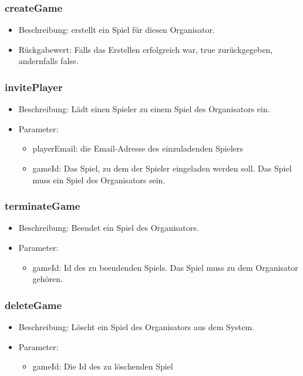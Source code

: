 \documentclass[a4paper]{scrreprt}
\begin{document}
    \subsubsection{createGame}
    \begin{itemize}
        \item Beschreibung: erstellt ein Spiel für diesen Organisator.
        \item Rückgabewert: Falls das Erstellen erfolgreich war, true zurückgegeben, andernfalls false.
    \end{itemize}
    \subsubsection{invitePlayer}
    \begin{itemize}
        \item Beschreibung: Lädt einen Spieler zu einem Spiel des Organisators ein.
        \item Parameter:
        \begin{itemize}
            \item playerEmail: die Email-Adresse des einzuladenden Spielers
            \item gameId: Das Spiel, zu dem der Spieler eingeladen werden soll. Das Spiel muss ein Spiel des Organisators sein.
        \end{itemize}
    \end{itemize}
    \subsubsection{terminateGame}
    \begin{itemize}
        \item Beschreibung: Beendet ein Spiel des Organisators.
        \item Parameter:
        \begin{itemize}
            \item gameId: Id des zu beendenden Spiels. Das Spiel muss zu dem Organisator gehören.
        \end{itemize}
    \end{itemize}
    \subsubsection{deleteGame}
    \begin{itemize}
        \item Beschreibung: Löscht ein Spiel des Organisators aus dem System.
        \item Parameter:
        \begin{itemize}
            \item gameId: Die Id des zu löschenden Spiel
        \end{itemize}
    \end{itemize}
\end{document}
